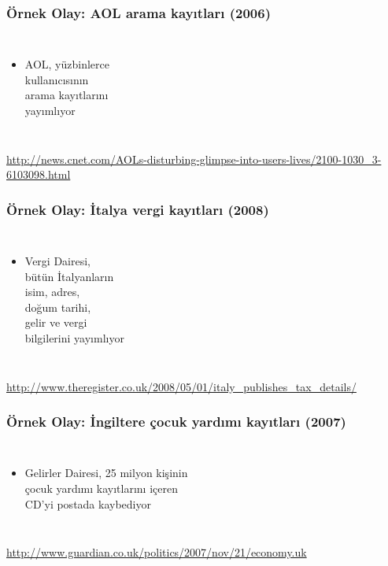 \documentclass[dvipsnames]{beamer}
\theoremstyle{definition}
\theoremstyle{example}
\theoremstyle{plain}
\begin{document}
\begin{frame}
  \frametitle{Örnek Olay: AOL arama kayıtları (2006)}

  \begin{columns}

    \begin{itemize}
      \item AOL, yüzbinlerce\\
        kullanıcısının\\
        arama kayıtlarını\\
        yayımlıyor
    \end{itemize}
  \end{columns}

  \medskip
  \tiny{\url{http://news.cnet.com/AOLs-disturbing-glimpse-into-users-lives/2100-1030_3-6103098.html}}
\end{frame}

\begin{frame}
  \frametitle{Örnek Olay: İtalya vergi kayıtları (2008)}

  \begin{columns}

    \begin{itemize}
      \item Vergi Dairesi,\\
        bütün İtalyanların\\
        isim, adres,\\
        doğum tarihi,\\
        gelir ve vergi\\
        bilgilerini yayımlıyor
    \end{itemize}
  \end{columns}

  \medskip
  \tiny{\url{http://www.theregister.co.uk/2008/05/01/italy_publishes_tax_details/}}
\end{frame}

\begin{frame}
  \frametitle{Örnek Olay: İngiltere çocuk yardımı kayıtları (2007)}

  \begin{columns}

    \begin{itemize}
      \item Gelirler Dairesi, 25 milyon kişinin\\
        çocuk yardımı kayıtlarını içeren\\
        CD'yi postada kaybediyor
    \end{itemize}
  \end{columns}

  \medskip
  \tiny{\url{http://www.guardian.co.uk/politics/2007/nov/21/economy.uk}}
\end{frame}
\end{document}
